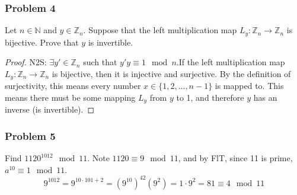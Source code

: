 \documentclass[hidelinks,12pt]{article}
\newcommand{\N}{\mathbb{N}}
\newcommand{\Z}{\mathbb{Z}}
\begin{document}
\subsubsection{Problem 4}
Let $n\in\N$ and $y\in\Z_n$. Suppose that the left multiplication map $L_y:\Z_n\to\Z_n$ is bijective. Prove that $y$ is invertible.
\begin{proof}
N2S: $\exists y'\in\Z_n$ such that $y'y\equiv1\mod{n}$.\newline If the left multiplication map $L_y:\Z_n\to\Z_n$ is bijective, then it is injective and surjective. By the definition of surjectivity, this means every number $x\in\{1,2,...,n-1\}$ is mapped to. This means there must be some mapping $L_y$ from $y$ to 1, and therefore $y$ has an inverse (is invertible).
\end{proof}
\subsubsection{Problem 5}
Find $1120^{1012}\mod{11}$.
\newline Note $1120\equiv9\mod{11}$, and by FlT, since 11 is prime, $a^{10}\equiv1\mod{11}$. $$9^{1012}=9^{10\cdot101+2}=(9^{10})^{42}(9^2)=1\cdot9^2=81\equiv4\mod{11}$$
\end{document}
